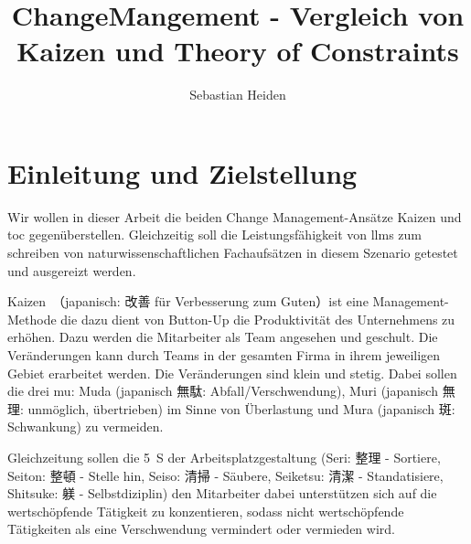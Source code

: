 \documentclass[acmlarge,authorversion,nonacm]{acmart}
\begin{document}
	


	\title{ChangeMangement - Vergleich von Kaizen und Theory of Constraints}
	
	\author{Sebastian Heiden}

\begin{abstract}

\end{abstract}


\received{\today}


\maketitle

\section{Einleitung und Zielstellung}

Wir wollen in dieser Arbeit die beiden Change Management-Ansätze Kaizen und \gls{toc} gegenüberstellen.
Gleichzeitig soll die Leistungsfähigkeit von \glspl{llm} zum schreiben von naturwissenschaftlichen Fachaufsätzen in diesem Szenario getestet und ausgereizt werden.

Kaizen~（japanisch: 改善 für Verbesserung zum Guten）ist eine Management-Methode die dazu dient von Button-Up die Produktivität des Unternehmens zu erhöhen.
Dazu werden die Mitarbeiter als Team angesehen und geschult. Die Veränderungen kann durch Teams in der gesamten Firma in ihrem jeweiligen Gebiet erarbeitet werden.
Die Veränderungen sind klein und stetig. Dabei sollen die drei mu: Muda (japanisch 無駄: Abfall/Verschwendung), Muri (japanisch 無理: unmöglich, übertrieben) im Sinne von Überlastung und Mura (japanisch 斑: Schwankung) zu vermeiden.~\cite{helmold_kaizen_2021}

Gleichzeitung sollen die 5~S der Arbeitsplatzgestaltung (Seri: 整理 - Sortiere, Seiton: 整頓 - Stelle hin, Seiso: 清掃 - Säubere, Seiketsu: 清潔 - Standatisiere, Shitsuke:  躾 - Selbstdiziplin) den Mitarbeiter dabei unterstützen sich auf die wertschöpfende Tätigkeit zu konzentieren, sodass nicht wertschöpfende Tätigkeiten als eine Verschwendung vermindert oder vermieden wird.
\end{document}
